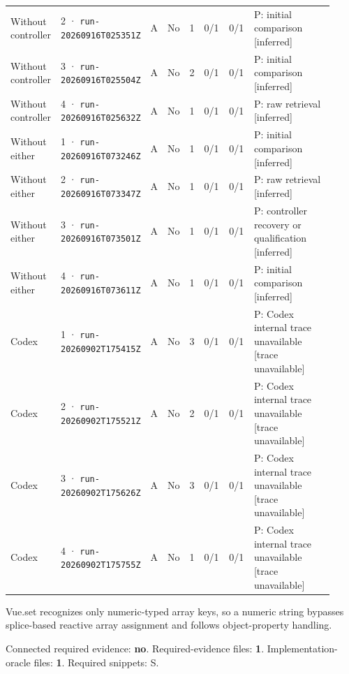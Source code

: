 \begin{landscape}
\begin{longtable}{@{}L{0.11\linewidth}L{0.16\linewidth}*{1}{L{0.022\linewidth}}L{0.05\linewidth}L{0.045\linewidth}L{0.08\linewidth}L{0.085\linewidth}L{0.368\linewidth}@{}}
Without controller & 2 · \texttt{run-20260916\allowbreak T025351Z} & A & No & 1 & 0/1 & 0/1 & P: initial comparison [inferred] \\
Without controller & 3 · \texttt{run-20260916\allowbreak T025504Z} & A & No & 2 & 0/1 & 0/1 & P: initial comparison [inferred] \\
Without controller & 4 · \texttt{run-20260916\allowbreak T025632Z} & A & No & 1 & 0/1 & 0/1 & P: raw retrieval [inferred] \\
Without either & 1 · \texttt{run-20260916\allowbreak T073246Z} & A & No & 1 & 0/1 & 0/1 & P: initial comparison [inferred] \\
Without either & 2 · \texttt{run-20260916\allowbreak T073347Z} & A & No & 1 & 0/1 & 0/1 & P: raw retrieval [inferred] \\
Without either & 3 · \texttt{run-20260916\allowbreak T073501Z} & A & No & 1 & 0/1 & 0/1 & P: controller recovery or qualification [inferred] \\
Without either & 4 · \texttt{run-20260916\allowbreak T073611Z} & A & No & 1 & 0/1 & 0/1 & P: initial comparison [inferred] \\
Codex & 1 · \texttt{run-20260902\allowbreak T175415Z} & A & No & 3 & 0/1 & 0/1 & P: Codex internal trace unavailable [trace unavailable] \\
Codex & 2 · \texttt{run-20260902\allowbreak T175521Z} & A & No & 2 & 0/1 & 0/1 & P: Codex internal trace unavailable [trace unavailable] \\
Codex & 3 · \texttt{run-20260902\allowbreak T175626Z} & A & No & 3 & 0/1 & 0/1 & P: Codex internal trace unavailable [trace unavailable] \\
Codex & 4 · \texttt{run-20260902\allowbreak T175755Z} & A & No & 1 & 0/1 & 0/1 & P: Codex internal trace unavailable [trace unavailable] \\
\end{longtable}
\endgroup
\end{landscape}

\label{sec:vuejs-vue-5884}

Vue.set recognizes only numeric-typed array keys, so a numeric string bypasses splice-based reactive array assignment and follows object-property handling.

Connected required evidence: \textbf{no}. Required-evidence files: \textbf{1}. Implementation-oracle files: \textbf{1}. Required snippets: S.

